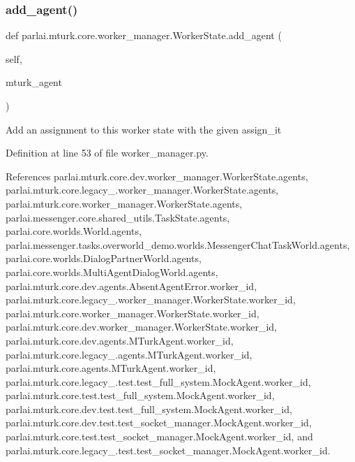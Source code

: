 \mbox{\label{classparlai_1_1mturk_1_1core_1_1worker__manager_1_1WorkerState_aa9680796261d0a48686474fb44741032}} 
\subsubsection{\texorpdfstring{add\+\_\+agent()}{add\_agent()}}
{\footnotesize\ttfamily def parlai.\+mturk.\+core.\+worker\+\_\+manager.\+Worker\+State.\+add\+\_\+agent (\begin{DoxyParamCaption}\item[{}]{self,  }\item[{}]{mturk\+\_\+agent }\end{DoxyParamCaption})}

\begin{DoxyVerb}Add an assignment to this worker state with the given assign_it\end{DoxyVerb}
 

Definition at line 53 of file worker\+\_\+manager.\+py.



References parlai.\+mturk.\+core.\+dev.\+worker\+\_\+manager.\+Worker\+State.\+agents, parlai.\+mturk.\+core.\+legacy\+\_.\+worker\+\_\+manager.\+Worker\+State.\+agents, parlai.\+mturk.\+core.\+worker\+\_\+manager.\+Worker\+State.\+agents, parlai.\+messenger.\+core.\+shared\+\_\+utils.\+Task\+State.\+agents, parlai.\+core.\+worlds.\+World.\+agents, parlai.\+messenger.\+tasks.\+overworld\+\_\+demo.\+worlds.\+Messenger\+Chat\+Task\+World.\+agents, parlai.\+core.\+worlds.\+Dialog\+Partner\+World.\+agents, parlai.\+core.\+worlds.\+Multi\+Agent\+Dialog\+World.\+agents, parlai.\+mturk.\+core.\+dev.\+agents.\+Absent\+Agent\+Error.\+worker\+\_\+id, parlai.\+mturk.\+core.\+legacy\+\_.\+worker\+\_\+manager.\+Worker\+State.\+worker\+\_\+id, parlai.\+mturk.\+core.\+worker\+\_\+manager.\+Worker\+State.\+worker\+\_\+id, parlai.\+mturk.\+core.\+dev.\+worker\+\_\+manager.\+Worker\+State.\+worker\+\_\+id, parlai.\+mturk.\+core.\+dev.\+agents.\+M\+Turk\+Agent.\+worker\+\_\+id, parlai.\+mturk.\+core.\+legacy\+\_.\+agents.\+M\+Turk\+Agent.\+worker\+\_\+id, parlai.\+mturk.\+core.\+agents.\+M\+Turk\+Agent.\+worker\+\_\+id, parlai.\+mturk.\+core.\+legacy\+\_.\+test.\+test\+\_\+full\+\_\+system.\+Mock\+Agent.\+worker\+\_\+id, parlai.\+mturk.\+core.\+test.\+test\+\_\+full\+\_\+system.\+Mock\+Agent.\+worker\+\_\+id, parlai.\+mturk.\+core.\+dev.\+test.\+test\+\_\+full\+\_\+system.\+Mock\+Agent.\+worker\+\_\+id, parlai.\+mturk.\+core.\+dev.\+test.\+test\+\_\+socket\+\_\+manager.\+Mock\+Agent.\+worker\+\_\+id, parlai.\+mturk.\+core.\+test.\+test\+\_\+socket\+\_\+manager.\+Mock\+Agent.\+worker\+\_\+id, and parlai.\+mturk.\+core.\+legacy\+\_.\+test.\+test\+\_\+socket\+\_\+manager.\+Mock\+Agent.\+worker\+\_\+id.


